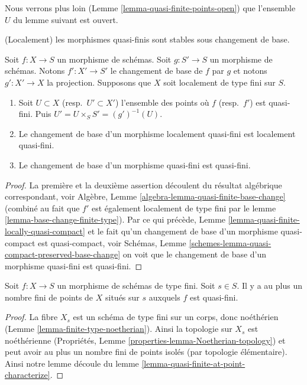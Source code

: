 \noindent
Nous verrons plus loin (Lemme \ref{lemma-quasi-finite-points-open}) que l'ensemble
$U$ du lemme suivant est ouvert.

\begin{lemma}
\label{lemma-base-change-quasi-finite}
\begin{slogan}
(Localement) les morphismes quasi-finis sont stables sous changement de base.
\end{slogan}
Soit $f : X \to S$ un morphisme de schémas. Soit $g : S' \to S$
un morphisme de schémas. Notons $f' : X' \to S'$
le changement de base de $f$ par $g$ et notons
$g' : X' \to X$ la projection. Supposons que $X$
soit localement de type fini sur $S$.
\begin{enumerate}
\item Soit $U \subset X$ (resp.\ $U' \subset X'$)
l'ensemble des points où $f$ (resp.\ $f'$)
est quasi-fini. Puis $U' = U \times_S S' = (g')^{-1}(U)$.
\item Le changement de base d'un morphisme localement quasi-fini est
localement quasi-fini.
\item Le changement de base d'un morphisme quasi-fini est
quasi-fini.
\end{enumerate}
\end{lemma}

\begin{proof}
La première et la deuxième assertion découlent du
résultat algébrique
correspondant, voir Algèbre, Lemme \ref{algebra-lemma-quasi-finite-base-change}
(combiné au fait que $f'$ est également localement
de type fini par le lemme \ref{lemma-base-change-finite-type}).
Par ce qui précède, Lemme \ref{lemma-quasi-finite-locally-quasi-compact} et le fait
qu'un changement de base d'un
morphisme quasi-compact est quasi-compact,
voir Schémas, Lemme \ref{schemes-lemma-quasi-compact-preserved-base-change} on voit que le changement
de base d'un morphisme quasi-fini est
quasi-fini.
\end{proof}

\begin{lemma}
\label{lemma-quasi-finite-at-a-finite-number-of-points}
Soit $f : X \to S$ un morphisme de schémas de type fini. Soit $s \in S$.
Il y a au plus un nombre fini de points de $X$ situés
sur $s$ auxquels $f$ est quasi-fini.
\end{lemma}

\begin{proof}
La fibre $X_s$ est un schéma de type fini
sur un corps, donc noéthérien (Lemme \ref{lemma-finite-type-noetherian}).
Ainsi la topologie sur $X_s$ est noéthérienne
(Propriétés, Lemme \ref{properties-lemma-Noetherian-topology})
et peut avoir au plus un nombre fini de points isolés (par
topologie élémentaire). Ainsi
notre lemme découle du lemme \ref{lemma-quasi-finite-at-point-characterize}.
\end{proof}


